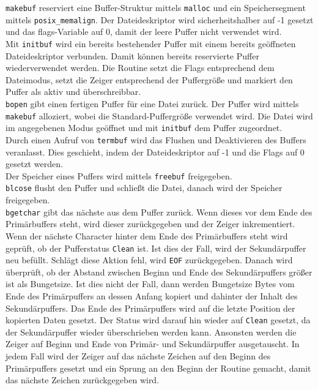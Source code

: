 \texttt{makebuf} reserviert eine Buffer-Struktur mittels \texttt{malloc}
und ein Speichersegment	mittels \texttt{posix\_memalign}.
Der Dateideskriptor wird sicherheitshalber auf -1 gesetzt und das flags-Variable auf 0,
damit der leere Puffer nicht verwendet wird. \\
Mit \texttt{initbuf} wird ein bereits bestehender Puffer mit einem bereits geöffneten Dateideskriptor verbunden.
Damit können bereits reservierte Puffer wiederverwendet werden.
Die Routine setzt die Flags entsprechend dem Dateimodus,
setzt die Zeiger entsprechend der Puffergröße
und markiert den Puffer als aktiv und überschreibbar. \\
\texttt{bopen} gibt einen fertigen Puffer für eine Datei zurück.
Der Puffer wird mittels \texttt{makebuf} alloziert,
wobei die Standard-Puffergröße verwendet wird.
Die Datei wird im angegebenen Modus geöffnet
und mit \texttt{initbuf} dem Puffer zugeordnet. \\
Durch einen Aufruf von \texttt{termbuf} wird das Flushen und Deaktivieren des Buffers veranlasst.
Dies geschieht, indem der Dateideskriptor auf -1 und die Flags auf 0 gesetzt werden. \\
Der Speicher eines Puffers wird mittels \texttt{freebuf} freigegeben. \\
\texttt{blcose} flusht den Puffer und schließt die Datei,
danach wird der Speicher freigegeben. \\
\texttt{bgetchar} gibt das nächste aus dem Puffer zurück.
Wenn dieses vor dem Ende des Primärbuffers steht,
wird dieser zurückgegeben und der Zeiger inkrementiert.
Wenn der nächste Character hinter dem Ende des Primärbuffers steht wird geprüft,
ob der Pufferstatus \texttt{Clean} ist.
Ist dies der Fall, wird der Sekundärpuffer neu befüllt.
Schlägt diese Aktion fehl, wird \texttt{EOF} zurückgegeben.
Danach wird überprüft,
ob der Abstand zwischen Beginn und Ende des Sekundärpuffers größer ist als Bungetsize.
Ist dies nicht der Fall,
dann werden Bungetsize Bytes vom Ende des Primärpuffers an dessen Anfang kopiert
und dahinter der Inhalt des Sekundärpuffers.
Das Ende des Primärpuffers wird auf die letzte Position der kopierten Daten gesetzt.
Der Status wird darauf hin wieder auf \texttt{Clean} gesetzt,
da der Sekundärpuffer wieder überschrieben werden kann.
Ansonsten werden die Zeiger auf Beginn und Ende von Primär- und Sekundärpuffer ausgetauscht.
In jedem Fall wird der Zeiger auf das nächste Zeichen auf den Beginn des Primärpuffers gesetzt und ein Sprung an den Beginn	der Routine gemacht,
damit das nächste Zeichen zurückgegeben wird. \\
